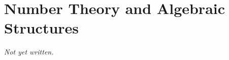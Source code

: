 \chapter{Number Theory and Algebraic Structures}\label{ch:number-theory-algebraic-structures}


\textit{Not yet written.}
